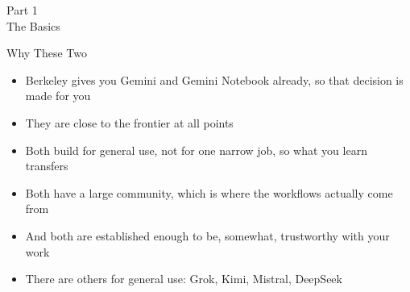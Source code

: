 \documentclass[aspectratio=169]{beamer}
\begin{document}

\begin{frame}[plain]
    \vfill
    \begin{center}
        {\Huge Part 1}\\[0.8em]
        {\Large The Basics}
    \end{center}
    \vfill
\end{frame}

\begin{frame}{Why These Two}
    \begin{itemize}
        \item Berkeley gives you Gemini and Gemini Notebook already, so that decision is
              made for you
        \item They are close to the frontier at all points
        \item Both build for general use, not for one narrow job, so what you learn
              transfers
        \item Both have a large community, which is where the workflows actually come from
        \item And both are established enough to be, somewhat, trustworthy with your work
        \item There are others for general use: Grok, Kimi, Mistral, DeepSeek
    \end{itemize}
\end{frame}
\end{document}
